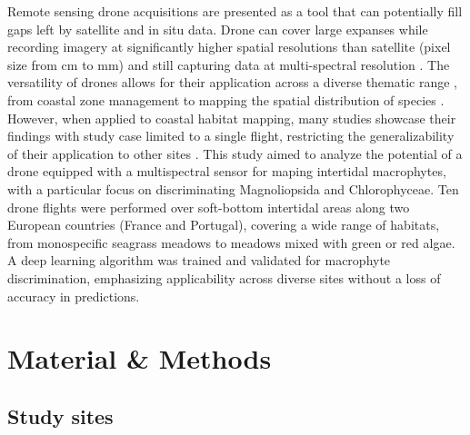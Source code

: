 \documentclass[
  number]{elsarticle}
\begin{document}
Remote sensing drone acquisitions are presented as a tool that can
potentially fill gaps left by satellite and in situ data. Drone can
cover large expanses while recording imagery at significantly higher
spatial resolutions than satellite (pixel size from cm to mm) and still
capturing data at multi-spectral resolution \citetext{\citealp[
]{fairley2022drone}; \citealp{oh2017use}}. The versatility of drones
allows for their application across a diverse thematic range , from
coastal zone management \citetext{\citealp[ ]{adade2021}; \citealp[
]{casella2020}; \citealp{angnuureng2022}} to mapping the spatial
distribution of species \citetext{\citealp[ ]{joyce2023}; \citealp[
]{tallam2023}; \citealp[ ]{Roca2022}; \citealp[
]{Roman2021}; \citealp{Brunier2022Topographic}}. However, when applied
to coastal habitat mapping, many studies showcase their findings with
study case limited to a single flight, restricting the generalizability
of their application to other sites \citetext{\citealp[
]{Roman2021}; \citealp[ ]{collin2019improving}; \citealp[
]{rossiter2020uav}; \citealp{Brunier2022Topographic}}. This study aimed
to analyze the potential of a drone equipped with a multispectral sensor
for maping intertidal macrophytes, with a particular focus on
discriminating Magnoliopsida and Chlorophyceae. Ten drone flights were
performed over soft-bottom intertidal areas along two European countries
(France and Portugal), covering a wide range of habitats, from
monospecific seagrass meadows to meadows mixed with green or red algae.
A deep learning algorithm was trained and validated for macrophyte
discrimination, emphasizing applicability across diverse sites without a
loss of accuracy in predictions.

\section{Material \& Methods}\label{material-methods}

\subsection{Study sites}\label{study-sites}
\end{document}
